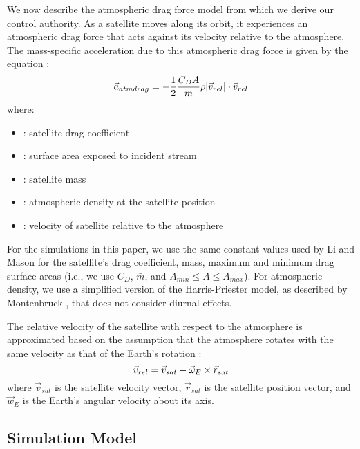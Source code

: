 \documentclass[letterpaper, 10 pt, conference]{ieeeconf}  %
\begin{document}
We now describe the atmospheric drag force model from which we derive our control authority. As a satellite moves along its orbit, it experiences an atmospheric drag force that acts against its velocity relative to the atmosphere. The mass-specific acceleration due to this atmospheric drag force is given by the equation \cite{Montenbruck}:
\begin{equation} 
 \vec{a}_{atmdrag}  = -\frac{1}{2}\frac{C_DA}{m}\rho \lvert \vec{v}_{rel} \rvert \cdot \vec{v}_{rel} \\
\end{equation}
where:

\begin{itemize}
\item[] { : satellite drag coefficient}
\item[] { : surface area exposed to incident stream}
\item[] { : satellite mass}
\item[] {\makebox[0.4cm]{$\rho$\hfill} : atmospheric density at the satellite position}
\item[] { : velocity of satellite relative to the atmosphere} \\
\end{itemize} 

For the simulations in this paper, we use the same constant values used by Li and Mason \cite{Planet1}  for the satellite's drag coefficient, mass, maximum and minimum drag surface areas (i.e., we use $\bar{C}_D$, $\bar{m}$, and $A_{min} \leq A \leq A_{max}$). For atmospheric density, we use a simplified version of the Harris-Priester model, as described by Montenbruck \cite{Montenbruck}, that does not consider diurnal effects. 

The relative velocity of the satellite with respect to the atmosphere is approximated based on the assumption that the atmosphere rotates with the same velocity as that of the Earth's rotation \cite{Montenbruck}:
\begin{equation} 
\vec{v}_{rel} = \vec{v}_{sat} - \vec{\omega}_{E} \times \vec{r}_{sat} \\
\label{eqn:relvel}
\end{equation}
where $\vec{v}_{sat}$ is the satellite velocity vector, $\vec{r}_{sat}$ is the satellite position vector, and $\vec{w}_{E}$ is the Earth's angular velocity about its axis.

\subsection{Simulation Model}
\end{document}
